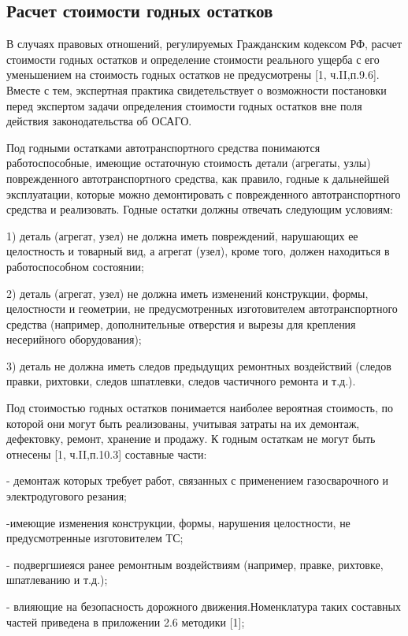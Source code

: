 \subsection{Расчет стоимости годных остатков}

\par В случаях правовых отношений, регулируемых Гражданским кодексом РФ, расчет стоимости годных остатков и определение стоимости  реального ущерба с его уменьшением на стоимость годных остатков не предусмотрены [1, ч.II,п.9.6]. Вместе с тем, экспертная практика свидетельствует о возможности постановки перед экспертом задачи определения стоимости годных остатков вне  поля действия законодательства об ОСАГО.
\par Под годными остатками автотранспортного средства понимаются работоспособные, имеющие остаточную стоимость детали (агрегаты, узлы) поврежденного автотранспортного средства, как правило, годные к дальнейшей эксплуатации, которые можно демонтировать с поврежденного автотранспортного средства и реализовать. 
Годные остатки должны отвечать следующим условиям:

1) деталь (агрегат, узел) не должна иметь повреждений, нарушающих ее целостность и товарный вид, а агрегат (узел), кроме того, должен находиться в работоспособном состоянии;

2) деталь (агрегат, узел) не должна иметь изменений конструкции, формы, целостности и геометрии, не предусмотренных изготовителем автотранспортного средства (например, дополнительные отверстия и вырезы для крепления несерийного оборудования);

3) деталь не должна иметь следов предыдущих ремонтных воздействий (следов правки, рихтовки, следов шпатлевки, следов частичного ремонта и т.д.).

Под стоимостью годных остатков понимается наиболее вероятная стоимость, по которой они могут быть реализованы, учитывая затраты на их демонтаж, дефектовку, ремонт, хранение и продажу.
К годным остаткам не могут быть отнесены [1, ч.II,п.10.3] составные части:

- демонтаж которых требует работ, связанных с применением газосварочного и электродугового резания;

-имеющие изменения конструкции, формы, нарушения целостности, не предусмотренные изготовителем ТС;

- подвергшиеяся ранее ремонтным воздействиям (например, правке, рихтовке, шпатлеванию  и т.д.);

- влияющие на безопасность дорожного движения.Номенклатура таких составных частей приведена в приложении  2.6 методики [1];

